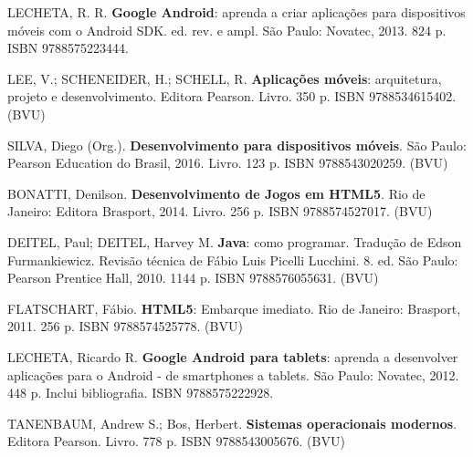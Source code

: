 \begin{pud}
    
	\clearpage
	\begin{bibbasica}
			
        \item LECHETA, R. R. \textbf{Google Android}: aprenda a criar aplicações para dispositivos móveis com o Android SDK.  ed. rev. e ampl. São Paulo: Novatec, 2013. 824 p. ISBN 9788575223444. 
 		\item LEE, V.; SCHENEIDER, H.; SCHELL, R. \textbf{Aplicações móveis}: arquitetura, projeto e desenvolvimento. Editora Pearson. Livro. 350 p. ISBN 9788534615402. (BVU)
		\item SILVA, Diego (Org.). \textbf{Desenvolvimento para dispositivos móveis}.  São Paulo: Pearson Education do Brasil, 2016.  Livro. 123 p. ISBN 9788543020259. (BVU)
		
	\end{bibbasica}
	
	\begin{bibcomplementar}
    
    	\item  BONATTI, Denilson. \textbf{Desenvolvimento de Jogos em HTML5}. Rio de Janeiro: Editora Brasport, 2014. Livro. 256 p. ISBN 9788574527017. (BVU)
 		\item DEITEL, Paul; DEITEL, Harvey M. \textbf{Java}: como programar. Tradução de Edson Furmankiewicz. Revisão técnica de Fábio Luis Picelli Lucchini. 8. ed. São Paulo: Pearson Prentice Hall, 2010. 1144 p. ISBN 9788576055631. (BVU) 
		\item FLATSCHART, Fábio. \textbf{HTML5}: Embarque imediato. Rio de Janeiro: Brasport, 2011.  256 p. ISBN 9788574525778. (BVU)
		\item LECHETA, Ricardo R. \textbf{Google Android para tablets}: aprenda a desenvolver aplicações para o Android - de smartphones a tablets. São Paulo: Novatec, 2012. 448 p. Inclui bibliografia. ISBN 9788575222928.
		
		\item TANENBAUM, Andrew S.; Bos, Herbert. \textbf{Sistemas operacionais modernos}. Editora Pearson. Livro. 778 p. ISBN 9788543005676. (BVU)
		
	\end{bibcomplementar}
	
	
    	
	
\end{pud}



